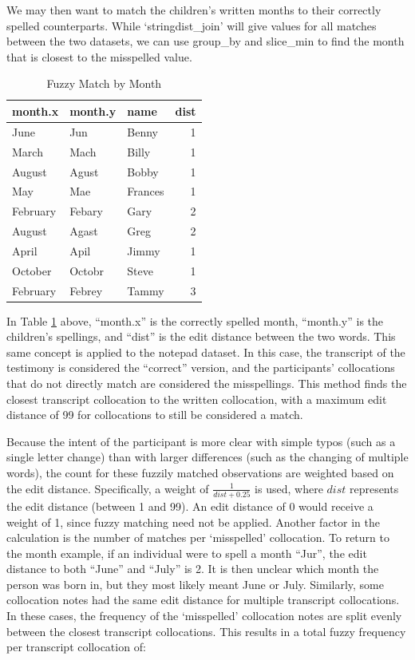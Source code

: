 \documentclass[print]{nuthesis}
\begin{document}
We may then want to match the children's written months to their correctly spelled counterparts.
While `stringdist\_join' will give values for all matches between the two datasets, we can use group\_by and slice\_min to find the month that is closest to the misspelled value.

\begin{table}

\caption{\label{tab:fuzzymonth}Fuzzy Match by Month}
\centering
\begin{tabular}[t]{l|l|l|r}
\hline
month.x & month.y & name & dist\\
\hline
June & Jun & Benny & 1\\
\hline
March & Mach & Billy & 1\\
\hline
August & Agust & Bobby & 1\\
\hline
May & Mae & Frances & 1\\
\hline
February & Febary & Gary & 2\\
\hline
August & Agast & Greg & 2\\
\hline
April & Apil & Jimmy & 1\\
\hline
October & Octobr & Steve & 1\\
\hline
February & Febrey & Tammy & 3\\
\hline
\end{tabular}
\end{table}

In Table \ref{tab:fuzzymonth} above, ``month.x'' is the correctly spelled month, ``month.y'' is the children's spellings, and ``dist'' is the edit distance between the two words.
This same concept is applied to the notepad dataset.
In this case, the transcript of the testimony is considered the ``correct'' version, and the participants' collocations that do not directly match are considered the misspellings.
This method finds the closest transcript collocation to the written collocation, with a maximum edit distance of 99 for collocations to still be considered a match.

Because the intent of the participant is more clear with simple typos (such as a single letter change) than with larger differences (such as the changing of multiple words), the count for these fuzzily matched observations are weighted based on the edit distance.
Specifically, a weight of \(\frac{1}{dist+0.25}\) is used, where \(dist\) represents the edit distance (between 1 and 99).
An edit distance of 0 would receive a weight of 1, since fuzzy matching need not be applied.
Another factor in the calculation is the number of matches per `misspelled' collocation.
To return to the month example, if an individual were to spell a month ``Jur'', the edit distance to both ``June'' and ``July'' is 2.
It is then unclear which month the person was born in, but they most likely meant June or July.
Similarly, some collocation notes had the same edit distance for multiple transcript collocations.
In these cases, the frequency of the `misspelled' collocation notes are split evenly between the closest transcript collocations.
This results in a total fuzzy frequency per transcript collocation of:
\end{document}

